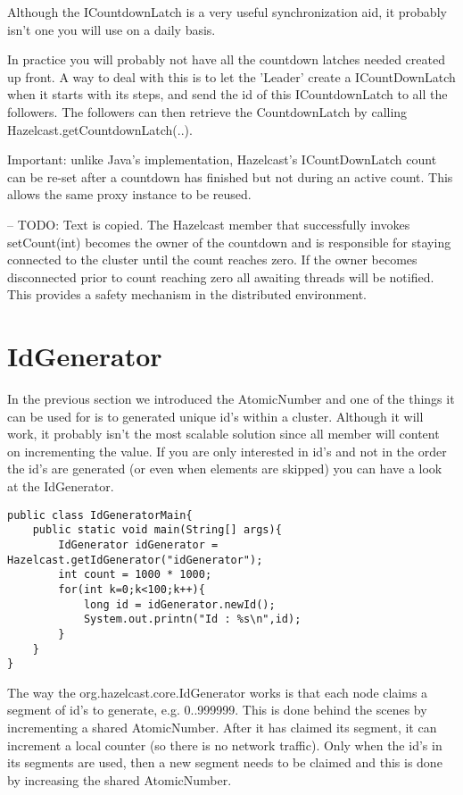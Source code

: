 Although the ICountdownLatch is a very useful synchronization aid, it probably isn't one
you will use on a daily basis.

In practice you will probably not have all the countdown latches needed created up front.
A way to deal with this is to let the 'Leader' create a ICountDownLatch when it starts with
its steps, and send the id of this ICountdownLatch to all the followers. The followers can 
then retrieve the CountdownLatch by calling Hazelcast.getCountdownLatch(..).

Important: unlike Java's implementation, Hazelcast's ICountDownLatch count can be re-set
after a countdown has finished but not during an active count. This allows the same
proxy instance to be reused.

-- TODO: Text is copied.
The Hazelcast member that successfully invokes setCount(int) becomes the owner of the countdown 
and is responsible for staying connected to the cluster until the count reaches zero. If the owner 
becomes disconnected prior to count reaching zero all awaiting threads will be notified. This provides 
a safety mechanism in the distributed environment.


\section{IdGenerator}

In the previous section we introduced the AtomicNumber and one of the things it
can be used for is to generated unique id's within a cluster. Although it will work,
it probably isn't the most scalable solution since all member will content on incrementing
the value. If you are only interested in id's and not in the order the id's are generated 
(or even when elements are skipped) you can have a look at the IdGenerator.

\begin{verbatim}
public class IdGeneratorMain{
    public static void main(String[] args){
        IdGenerator idGenerator = Hazelcast.getIdGenerator("idGenerator");
        int count = 1000 * 1000;
        for(int k=0;k<100;k++){
            long id = idGenerator.newId();
            System.out.printn("Id : %s\n",id);
        }
    }
}
\end{verbatim}

The way the org.hazelcast.core.IdGenerator works is that each node claims a segment of 
id's to generate, e.g. 0..999999. This is done behind the scenes by incrementing a shared 
AtomicNumber. After it has claimed its segment, it can increment a local counter (so there is 
no network traffic). Only when the id's in its segments are used, then a new segment
needs to be claimed and this is done by increasing the shared AtomicNumber.

